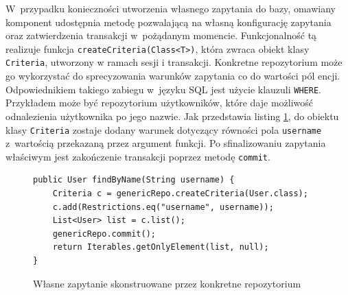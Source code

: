\documentclass[a4paper]{book}
\begin{document}
{W~przypadku konieczności utworzenia własnego zapytania do bazy, omawiany komponent udostępnia metodę pozwalającą na własną konfigurację zapytania oraz zatwierdzenia transakcji w~pożądanym momencie. Funkcjonalność tą realizuje funkcja \lstinline|createCriteria(Class<T>)|, która zwraca obiekt klasy \lstinline|Criteria|, utworzony w ramach sesji i transakcji. Konkretne repozytorium może go wykorzystać do sprecyzowania warunków zapytania co do wartości pól encji. Odpowiednikiem takiego zabiegu w~języku SQL jest użycie klauzuli \lstinline|WHERE|. Przykładem może być repozytorium użytkowników, które daje możliwość odnalezienia użytkownika po jego nazwie. Jak przedstawia listing \ref{id:fig:listing:UserCriteria}, do obiektu klasy \lstinline|Criteria| zostaje dodany warunek dotyczący równości pola \lstinline|username| z~wartością przekazaną przez argument funkcji. Po sfinalizowaniu zapytania właściwym jest zakończenie transakcji poprzez metodę \lstinline|commit|.
\begin{figure}
\begin{lstlisting}
public User findByName(String username) {
	Criteria c = genericRepo.createCriteria(User.class);
	c.add(Restrictions.eq("username", username));
	List<User> list = c.list();
	genericRepo.commit();
	return Iterables.getOnlyElement(list, null);
}
\end{lstlisting}
\caption{Własne zapytanie skonstruowane przez konkretne repozytorium}
\label{id:fig:listing:UserCriteria}
\end{figure}


}
\end{document}
